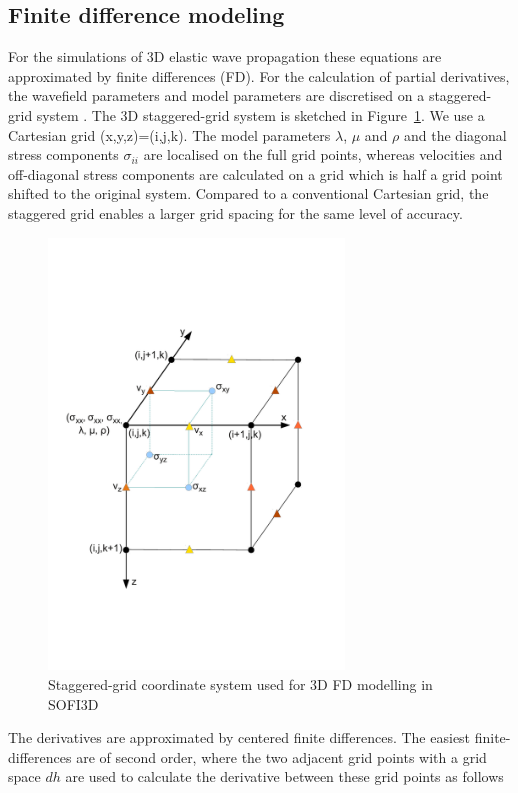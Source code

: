 \subsection{Finite difference modeling}\label{sec:FDmodeling}
For the simulations of 3D elastic wave propagation these equations are approximated by finite differences (FD). For the calculation of partial derivatives, the wavefield parameters and model parameters are discretised on a staggered-grid system \citep{Vir86, Lev88}. The 3D staggered-grid system is sketched in Figure~\ref{fig:stag_grid}. We use a Cartesian grid (x,y,z)=(i,j,k). The model parameters $\lambda$, $\mu$ and $\rho$ and the diagonal stress components $\sigma_{ii}$ are localised on the full grid points, whereas velocities and off-diagonal stress components are calculated on a grid which is half a grid point shifted to the original system. Compared to a conventional Cartesian grid, the staggered grid enables a larger grid spacing for the same level of accuracy.\\
\begin{figure}
\includegraphics[width=0.7\textwidth]{fig/staggered_grid}
\caption[Staggered grid system]{Staggered-grid coordinate system used for 3D FD modelling in SOFI3D}\label{fig:stag_grid}
\end{figure}
The derivatives are approximated by centered finite differences. The easiest finite-differences are of second order, where the two adjacent grid points with a grid space $dh$ are used to calculate the derivative between these grid points as follows
